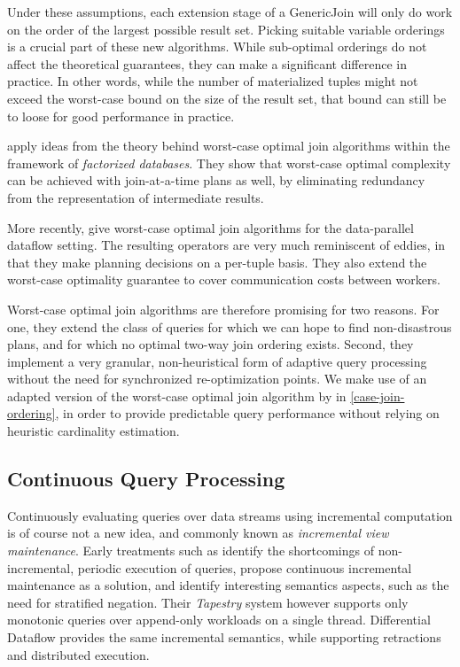 \documentclass[../index.tex]{subfiles}
\begin{document}
Under these assumptions, each extension stage of a GenericJoin will
only do work on the order of the largest possible result set. Picking
suitable variable orderings is a crucial part of these new
algorithms. While sub-optimal orderings do not affect the theoretical
guarantees, they can make a significant difference in practice. In
other words, while the number of materialized tuples might not exceed
the worst-case bound on the size of the result set, that bound can
still be to loose for good performance in practice.

\cite{ciucanu2015worst} apply ideas from the theory behind worst-case
optimal join algorithms within the framework of \emph{factorized
  databases}. They show that worst-case optimal complexity can be
achieved with join-at-a-time plans as well, by eliminating redundancy
from the representation of intermediate results.

More recently, \cite{ammar2018distributed} give worst-case optimal
join algorithms for the data-parallel dataflow setting. The resulting
operators are very much reminiscent of eddies, in that they make
planning decisions on a per-tuple basis. They also extend the
worst-case optimality guarantee to cover communication costs between
workers.

Worst-case optimal join algorithms are therefore promising for two
reasons. For one, they extend the class of queries for which we can
hope to find non-disastrous plans, and for which no optimal two-way
join ordering exists. Second, they implement a very granular,
non-heuristical form of adaptive query processing without the need for
synchronized re-optimization points. We make use of an adapted version
of the worst-case optimal join algorithm by
\cite{ammar2018distributed} in \autoref{case-join-ordering}, in order
to provide predictable query performance without relying on heuristic
cardinality estimation.

\subsection{Continuous Query Processing}

Continuously evaluating queries over data streams using incremental
computation is of course not a new idea, and commonly known as
\emph{incremental view maintenance}. Early treatments such as
\cite{terry1992continuous} identify the shortcomings of
non-incremental, periodic execution of queries, propose continuous
incremental maintenance as a solution, and identify interesting
semantics aspects, such as the need for stratified negation. Their
\emph{Tapestry} system however supports only monotonic queries over
append-only workloads on a single thread. Differential Dataflow
provides the same incremental semantics, while supporting retractions
and distributed execution.
\end{document}
